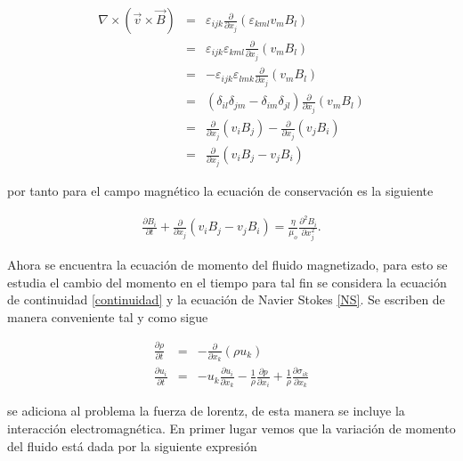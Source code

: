 \begin{eqnarray}
\nabla\times(\vec{v}\times\vec{B}) &=& \varepsilon_{ijk}\frac{\partial}{\partial x_{j}}(\varepsilon_{kml}v_{m}B_{l})\\
&=&\varepsilon_{ijk}\varepsilon_{kml}\frac{\partial}{\partial x_{j}}(v_{m}B_{l})\\
&=&-\varepsilon_{ijk}\varepsilon_{lmk}\frac{\partial}{\partial x_{j}}(v_{m}B_{l})\\
&=&(\delta_{il}\delta_{jm}-\delta_{im}\delta_{jl})\frac{\partial}{\partial x_{j}}(v_{m}B_{l})\\
&=&\frac{\partial}{\partial x_{j}}(v_{i}B_{j})-\frac{\partial}{\partial x_{j}}(v_{j}B_{i})\\
&=&\frac{\partial}{\partial x_{j}}(v_{i}B_{j}-v_{j}B_{i})
\end{eqnarray}

\noindent por tanto para el campo magnético  la ecuación de conservación es la siguiente 

\begin{eqnarray}
\label{induccionMHD}
\boxed{
\frac{\partial B_{i}}{\partial t} + \frac{\partial}{\partial x_{j}}(v_{i}B_{j}-v_{j}B_{i}) = \frac{\eta}{\mu_{o}}\frac{\partial^{2}B_{i}}{\partial x_{j}^{2}}
}.
\end{eqnarray}



\noindent Ahora se encuentra la ecuación de momento del fluido magnetizado, para esto se estudia el cambio del momento en el tiempo para tal fin se considera la ecuación de continuidad \eqref{continuidad} y la ecuación de Navier Stokes \eqref{NS}. Se escriben de manera conveniente tal y como sigue 

\begin{eqnarray}
\label{contindicial}
\frac{\partial \rho}{\partial t}&=&-\frac{\partial}{\partial x_{k}}(\rho u_{k})\\
\label{NSindicial}
\frac{\partial u_{i}}{\partial t} &=& -u_{k}\frac{\partial u_{i}}{\partial x_{k}} - \frac{1}{\rho}\frac{\partial p}{\partial x_{i}} + \frac{1}{\rho}\frac{\partial \sigma_{ik}}{\partial x_{k}}
\end{eqnarray}



\noindent se adiciona al problema la fuerza de lorentz, de esta manera se incluye la interacción electromagnética. En primer lugar vemos que la variación de momento del fluido está dada por la siguiente expresión 


